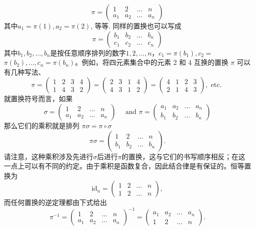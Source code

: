 \documentclass[hyperref,UTF8]{ctexbook}
\begin{document}
\[\pi=\begin{pmatrix}1&2&\dots&n\\a_1&a_2&\dots&a_n\end{pmatrix}\]
其中$a_1=\pi(1),a_2=\pi(2)$, 等等. 同样的置换也可以写成
$$
\pi=\left(\begin{array}{llll}
b_1 & b_2 & \ldots & b_n \\
c_1 & c_2 & \ldots & c_n
\end{array}\right)
$$
其中$b_1, b_2, \ldots,b_n$是按任意顺序排列的数字$1,2, \ldots,n$，$c_1=\pi\left(b_1\right), c_2=$ $\pi\left(b_2\right), \ldots,c_n=\pi\left(b_n\right)$。例如，将四元素集合中的元素 2 和 4 互换的置换 $\pi$ 可以有几种写法、
$$
\pi=\left(\begin{array}{llll}
1 & 2 & 3 & 4 \\
1 & 4 & 3 & 2
\end{array}\right)=\left(\begin{array}{llll}
2 & 3 & 1 & 4 \\
4 & 3 & 1 & 2
\end{array}\right)=\left(\begin{array}{llll}
4 & 1 & 2 & 3 \\
2 & 1 & 4 & 3
\end{array}\right), \text { etc. }
$$
就置换符号而言，如果
$$
\sigma=\left(\begin{array}{cccc}
1 & 2 & \ldots & n \\
a_1 & a_2 & \ldots & a_n
\end{array}\right) \quad \text { and } \pi=\left(\begin{array}{cccc}
a_1 & a_2 & \ldots & a_n \\
b_1 & b_2 & \ldots & b_n
\end{array}\right)
$$
那么它们的乘积就是排列 $\pi \sigma=\pi \circ \sigma$
$$
\pi \sigma=\left(\begin{array}{cccc}
1 & 2 & \ldots & n \\
b_1 & b_2 & \ldots & b_n
\end{array}\right) .
$$
请注意，这种乘积涉及先进行$\sigma$后进行$\pi$的置换，这与它们的书写顺序相反；在这一点上可以有不同的约定。由于乘积是函数复合，因此结合律是有保证的。恒等置换为
$$
\mathrm{id}_n=\left(\begin{array}{llll}
1 & 2 & \ldots & n \\
1 & 2 & \ldots & n
\end{array}\right),
$$
而任何置换的逆定理都由下式给出
$$
\pi^{-1}=\left(\begin{array}{cccc}
1 & 2 & \ldots & n \\
a_1 & a_2 & \ldots & a_n
\end{array}\right)^{-1}=\left(\begin{array}{cccc}
a_1 & a_2 & \ldots & a_n \\
1 & 2 & \ldots & n
\end{array}\right) .
$$
\end{document}
